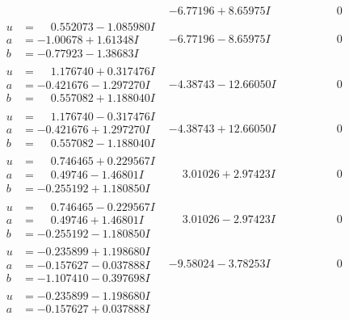 \documentclass[1p]{elsarticle_modified}
\theoremstyle{definition}
\begin{document}
$$\begin{array}{c|c|c}
 & -6.77196 + 8.65975 I & \phantom{-0.000000 } 0 \\ \hline\begin{aligned}
u &= \phantom{-}0.552073 - 1.085980 I \\
a &= -1.00678 + 1.61348 I \\
b &= -0.77923 - 1.38683 I\end{aligned}
 & -6.77196 - 8.65975 I & \phantom{-0.000000 } 0 \\ \hline\begin{aligned}
u &= \phantom{-}1.176740 + 0.317476 I \\
a &= -0.421676 - 1.297270 I \\
b &= \phantom{-}0.557082 + 1.188040 I\end{aligned}
 & -4.38743 - 12.66050 I & \phantom{-0.000000 } 0 \\ \hline\begin{aligned}
u &= \phantom{-}1.176740 - 0.317476 I \\
a &= -0.421676 + 1.297270 I \\
b &= \phantom{-}0.557082 - 1.188040 I\end{aligned}
 & -4.38743 + 12.66050 I & \phantom{-0.000000 } 0 \\ \hline\begin{aligned}
u &= \phantom{-}0.746465 + 0.229567 I \\
a &= \phantom{-}0.49746 - 1.46801 I \\
b &= -0.255192 + 1.180850 I\end{aligned}
 & \phantom{-}3.01026 + 2.97423 I & \phantom{-0.000000 } 0 \\ \hline\begin{aligned}
u &= \phantom{-}0.746465 - 0.229567 I \\
a &= \phantom{-}0.49746 + 1.46801 I \\
b &= -0.255192 - 1.180850 I\end{aligned}
 & \phantom{-}3.01026 - 2.97423 I & \phantom{-0.000000 } 0 \\ \hline\begin{aligned}
u &= -0.235899 + 1.198680 I \\
a &= -0.157627 - 0.037888 I \\
b &= -1.107410 - 0.397698 I\end{aligned}
 & -9.58024 - 3.78253 I & \phantom{-0.000000 } 0 \\ \hline\begin{aligned}
u &= -0.235899 - 1.198680 I \\
a &= -0.157627 + 0.037888 I \\

\end{aligned}
\end{array}$$
\end{document}

